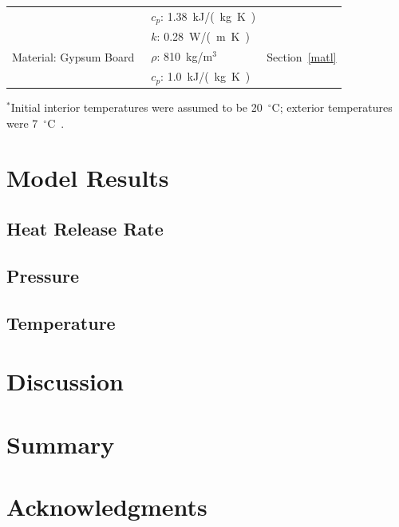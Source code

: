 \documentclass[12pt,oneside]{book}
\begin{document}
\begin{table}
\begin{tabular}{lll}
                                                           &  $c_{p}$: 1.38~\si{kJ/(kg.K)}                 &                                       \\ [.25cm]
\multirow{3}{*}{Material: Gypsum Board~\cite{WAKILI2007}}  &  $k$: 0.28~\si{W/(m.K)}                       &  \multirow{3}{*}{Section~\ref{matl}}  \\ 
                                                           &  $\rho$: 810~kg/m$^3$                         &                                       \\ 
                                                           &  $c_{p}$: 1.0~\si{kJ/(kg.K)}                  &                                       \\
\bottomrule[1.25pt]
\end{tabular}\par
\footnotesize
$^{*}$Initial interior temperatures were assumed to be 20~$^{\circ}$C; exterior temperatures were 7~$^{\circ}$C~\cite{NIOSH:Bowyer}.
\normalsize
\end{table}


\chapter{Model Results}
\label{results}

\section{Heat Release Rate}
\label{HRR}

\section{Pressure}

\section{Temperature}
\label{temp}

\chapter{Discussion}
\label{discuss}

\chapter{Summary}

\chapter{Acknowledgments}
\end{document}
